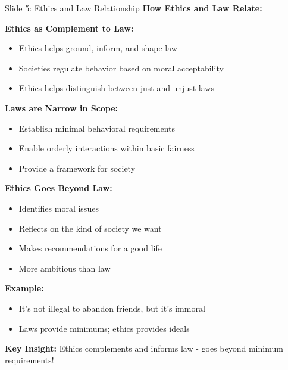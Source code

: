 \documentclass[8pt]{beamer}
\begin{document}
	\begin{frame}{Slide 5: Ethics and Law Relationship}
		\fontsize{6.5}{7.5}\selectfont
		\textbf{How Ethics and Law Relate:}
		
		\vspace{0.1cm}
		\textbf{Ethics as Complement to Law:}
		\begin{itemize}
			\item Ethics helps ground, inform, and shape law
			\item Societies regulate behavior based on moral acceptability
			\item Ethics helps distinguish between just and unjust laws
		\end{itemize}
		
		\vspace{0.1cm}
		\textbf{Laws are Narrow in Scope:}
		\begin{itemize}
			\item Establish minimal behavioral requirements
			\item Enable orderly interactions within basic fairness
			\item Provide a framework for society
		\end{itemize}
		
		\vspace{0.1cm}
		\textbf{Ethics Goes Beyond Law:}
		\begin{itemize}
			\item Identifies moral issues
			\item Reflects on the kind of society we want
			\item Makes recommendations for a good life
			\item More ambitious than law
		\end{itemize}
		
		\vspace{0.1cm}
		\textbf{Example:}
		\begin{itemize}
			\item It's not illegal to abandon friends, but it's immoral
			\item Laws provide minimums; ethics provides ideals
		\end{itemize}
		
		\textcolor{myblue}{\textbf{Key Insight:}} Ethics \textcolor{myblue}{complements and informs} law - goes beyond minimum requirements!
	\end{frame}
	
	
\end{document}
